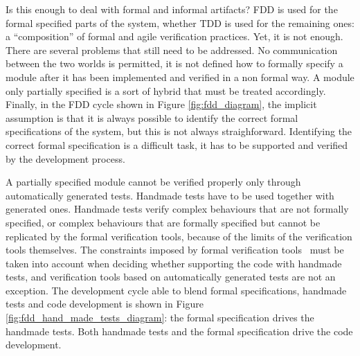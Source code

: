 \documentclass{article}
\begin{document}
Is this enough to deal with formal and informal artifacts?
FDD is used for the formal specified parts of the system, whether TDD is used for the remaining ones: a ``composition'' of formal and agile verification practices.
Yet, it is not enough.
There are several problems that still need to be addressed.
No communication between the two worlds is permitted, it is not defined how to formally specify a module after it has been implemented and verified in a non formal way.
A module only partially specified is a sort of hybrid that must be treated accordingly.
Finally, in the FDD cycle shown in Figure \ref{fig:fdd_diagram}, the implicit assumption is that it is always possible to identify the correct formal specifications of the system, but this is not always straighforward.
Identifying the correct formal specification is a difficult task, it has to be supported and verified by the development process.

A partially specified module cannot be verified properly only through automatically generated tests.
Handmade tests have to be used together with generated ones.
Handmade tests verify complex behaviours that are not formally specified, or complex behaviours that are formally specified but cannot be replicated by the formal verification tools, because of the limits of the verification tools themselves. 
The constraints imposed by formal verification tools~\cite{Glass2002} must be taken into account when deciding whether supporting the code with handmade tests, and verification tools based on automatically generated tests are not an exception.
The development cycle able to blend formal specifications, handmade tests and code development is shown in Figure \ref{fig:fdd_hand_made_tests_diagram}: the formal specification drives the handmade tests. 
Both handmade tests and the formal specification drive the code development.
\end{document}
